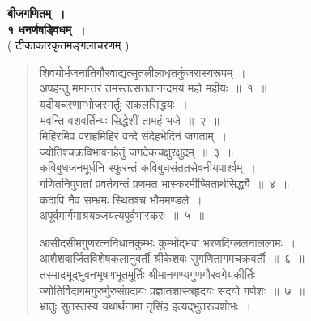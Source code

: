 \documentclass[11pt, openany]{book}
\begin{document}
\newpage
 \label{ch1}
\begin{center}
    \textbf{\Huge बीजगणितम्~।}\\
\vspace{0.8cm}
{\LARGE \textbf{१ धनर्णषड्विधम्~।}}\\
\vspace{0.5cm}
{\large ( टीकाकारकृतमङ्गलाचरणम् )}
\end{center}
\begin{quote}
    \q
शिवयोर्भजनातिगौरवाद्यत्सुतलीलाधृतकुंजरास्यरूपम्~।\\
 अपहन्तु ममान्तरं तमस्तत्सततानन्दमयं महो महीयः~॥~१~॥\\
 
 \vspace{-5mm}
 यदीयचरणाम्भोजस्मर्तुः सकलसिद्धयः~। \\
 भवन्ति वशवर्तिन्यः सिद्धेशीं तामहं भजे~॥~२~॥~\\
 
 \vspace{-5mm}
 मिहिरमिव वराहमिहिरं वन्दे संदेहभेदिनं जगताम्~।\\
 ज्योतिश्चक्रविभावनहेतुं जगदेकचक्षुरक्षुद्रम्~॥~३~॥~\\
 
 \vspace{-5mm}
 कविबुधजनमूर्धनि स्फुरन्तं कविबुधसंततसेवनीयपार्श्वम्~। \\
 गणितनिपुणतां प्रवर्तयन्तं प्रणमत भास्करमीप्सितार्थसिद्ध्यै~॥~४~॥\\

\vspace{-5mm}
 कदापि नैव सम्भ्रमः स्थितश्च भौममण्डले~। \\
 अपूर्वमार्गमाश्रयञ्जयत्यपूर्वभास्करः~॥~५~॥\\
\vspace{-2mm}

आसीदसीमगुणरत्ननिधानकुम्भः कुम्भोद्भवा भरणदिग्ललनाललामः~।\\
आशैशवार्जितविशेषकलानुवर्ती श्रीकेशवः सुगणितागमचक्रवर्ती~॥~६~॥\\

\vspace{-5mm}
तस्मादभूद्भुवनभूषणभूतमूर्तिः श्रीमानगण्यगुणगौरवगेयकीर्तिः~।\\
ज्योतिर्विदागमगुरुर्गुरुसंप्रदायः प्रज्ञातशास्त्रहृदयः सदयो गणेशः~॥~७~॥\\

\vspace{-5mm}
भ्रातुः सुतस्तस्य यथार्थनामा नृसिंह इत्यद्भुतरूपशोभः~।
 \end{quote}
\end{document}
